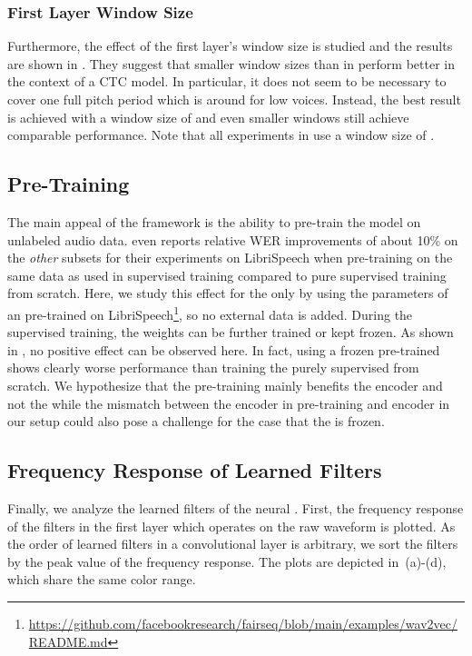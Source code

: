 \documentclass{INTERSPEECH2023}
\begin{document}
\subsubsection{First Layer Window Size}
\label{sec:scf_first_window}
Furthermore, the effect of the first layer's window size is studied and the results are shown in .
They suggest that smaller window sizes than in \cite{tuske2018:waveform} perform better in the context of a \conformer \gls{CTC} model.
In particular, it does not seem to be necessary to cover one full pitch period which is around  for low voices.
Instead, the best result is achieved with a window size of  and even smaller windows still achieve comparable performance.
Note that all experiments in  use a window size of .


\subsection{\wvtwo Pre-Training}
The main appeal of the \wvtwo framework is the ability to pre-train the model on unlabeled audio data.
\cite{facebook2020wav2vec2} even reports relative \gls{WER} improvements of about 10\% on the \textit{other} subsets for their experiments on LibriSpeech when pre-training on the same data as used in supervised training compared to pure supervised training from scratch.
Here, we study this effect for the \fe only by using the parameters of an \fe pre-trained on LibriSpeech\footnote{\raggedright\url{https://github.com/facebookresearch/fairseq/blob/main/examples/wav2vec/README.md}}, so no external data is added.
During the supervised training, the \fe weights can be further trained or kept frozen.
As shown in , no positive effect can be observed here.
In fact, using a frozen pre-trained \fe shows clearly worse performance than training the \fe purely supervised from scratch.
We hypothesize that the pre-training mainly benefits the \transformer encoder and not the \fe while the mismatch between the \transformer encoder in pre-training and \conformer encoder in our setup could also pose a challenge for the case that the \fe is frozen.


\subsection{Frequency Response of Learned Filters}
Finally, we analyze the learned filters of the neural \fes.
First, the frequency response of the filters in the first layer which operates on the raw waveform is plotted.
As the order of learned filters in a convolutional layer is arbitrary, we sort the filters by the peak value of the frequency response.
The plots are depicted in \,(a)-(d), which share the same color range.
\end{document}
